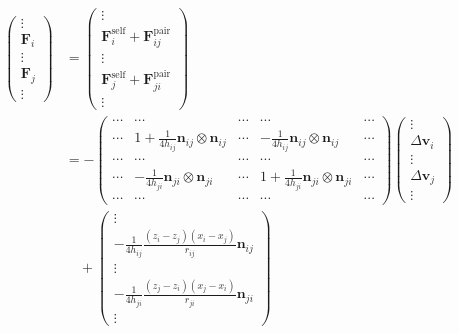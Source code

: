 \documentclass[11pt]{scrartcl}
\begin{document}
\begin{align}
\begin{pmatrix}
\vdots \\ \bm{F}_i \\ \vdots \\ \bm{F}_j \\  \vdots  
\end{pmatrix}
& =
\begin{pmatrix}
\vdots \\
\bm{F}_{i}^{\mathrm{self}} +  \bm{F}_{ij}^{\mathrm{pair}}  
\\ \vdots \\ 
\bm{F}_{j}^{\mathrm{self}} +  \bm{F}_{ji}^{\mathrm{pair}}  
\\  \vdots  
\end{pmatrix} \\
&=
-
\begin{pmatrix}
\cdots & \cdots & \cdots & \cdots & \cdots\\
\cdots & 1 + \frac{1}{4h_{ij}}\bm{n}_{ij} \otimes \bm{n}_{ij}  
& \cdots & -\frac{1}{4h_{ij}}\bm{n}_{ij} \otimes \bm{n}_{ij}   & \cdots\\
\cdots & \cdots & \cdots & \cdots & \cdots\\
\cdots & -\frac{1}{4h_{ji}}\bm{n}_{ji} \otimes \bm{n}_{ji} & \cdots 
& 1 + \frac{1}{4h_{ji}}\bm{n}_{ji} \otimes \bm{n}_{ji} 
 & \cdots \\
\cdots & \cdots & \cdots & \cdots & \cdots 
\end{pmatrix}
\begin{pmatrix}
\vdots \\
\Delta \bm{v}_i \\ 
\vdots \\
\Delta \bm{v}_j \\
\vdots 
\end{pmatrix} \\
& \quad 
+ 
\begin{pmatrix}
\vdots \\
-\frac{1}{4h_{ij}}
 \frac{(z_i - z_j )(x_i-x_j)}{r_{ij}} 
 \bm{n}_{ij} \\
\vdots \\
-\frac{1}{4h_{ji}} 
 \frac{(z_j - z_i )(x_j - x_i)}{r_{ji}} 
\bm{n}_{ji} \\
\vdots 
\end{pmatrix} 
\end{align}





\end{document}
